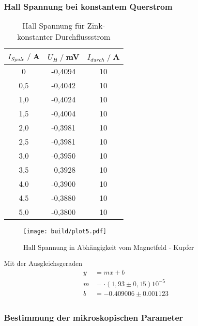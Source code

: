 \subsubsection{Hall Spannung bei konstantem Querstrom}
\begin{table}
    \centering
    \begin{tabular}{c c c}
        \toprule
        $I_{Spule} \;/\;$A & $U_H\;/\;$mV & $I_{durch} \;/\;$A\\
        \midrule
            0                   &-0,4094&             10\\
            0,5                 &-0,4042&             10\\
            1,0                 &-0,4024&             10\\
            1,5                 &-0,4004&             10\\
            2,0                 &-0,3981&             10\\
            2,5                 &-0,3981&             10\\
            3,0                 &-0,3950&             10\\
            3,5                 &-0,3928&             10\\
            4,0                 &-0,3900&             10\\
            4,5                 &-0,3880&             10\\
            5,0                 &-0,3800&             10\\
        \bottomrule
    \end{tabular}
    \caption{Hall Spannung für Zink- konstanter Durchflussstrom}
    \label{tab:Zn_I}
\end{table}
\begin{figure}[H]
    \centering
    \texttt{[image: build/plot5.pdf]}
    \caption{Hall Spannung in Abhängigkeit vom Magnetfeld - Kupfer}
    \label{fig:Cu_I}
\end{figure}
Mit der Ausgleichsgeraden
\begin{align*}
    y &= mx + b\\
    m &= \cdot (1,93\pm0,15)10^{-5}\\ %
    b &=  -0.409006\pm 0.001123\\ %
\end{align*}

\subsubsection{Bestimmung der mikroskopischen Parameter}
\label{sec:Auswertung}
